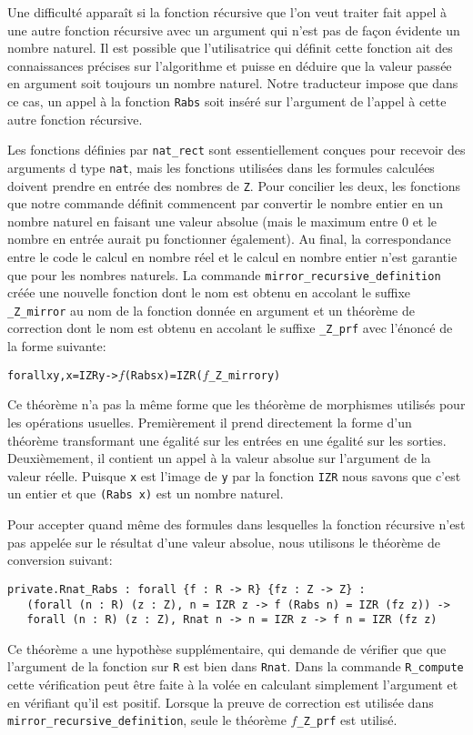\documentclass[draft]{jflart}
\begin{document}
Une difficulté apparaît si la fonction récursive que l'on veut traiter
fait appel à une autre fonction récursive avec un argument qui n'est
pas de façon évidente un nombre naturel.  Il est possible que
l'utilisatrice qui définit cette fonction ait des connaissances
précises sur l'algorithme et puisse en déduire que la valeur passée
en argument soit toujours un nombre naturel.  Notre traducteur impose
que dans ce cas, un appel à la fonction \texttt{Rabs} soit inséré sur
l'argument de l'appel à cette autre fonction récursive.

Les fonctions définies par \texttt{nat\_rect} sont essentiellement
conçues pour recevoir des arguments d type \texttt{nat}, mais les
fonctions utilisées dans les formules calculées doivent prendre en
entrée des nombres de \texttt{Z}.  Pour concilier les deux, les fonctions
que notre commande définit commencent par convertir le nombre entier en
un nombre naturel en faisant une valeur absolue (mais le maximum
entre 0 et le nombre en entrée aurait pu fonctionner également).  Au
final, la correspondance entre le code le calcul en nombre réel et le
calcul en nombre entier n'est garantie que pour les nombres naturels.
La commande \texttt{mirror\_recursive\_definition} créée une nouvelle
fonction dont le nom est obtenu en accolant le suffixe
\texttt{\_Z\_mirror} au nom de la fonction donnée en argument et un théorème
de correction dont le nom est obtenu en accolant le suffixe
\texttt{\_Z\_prf} avec l'énoncé de la forme suivante:
\begin{alltt}
forall x y, x = IZR y -> \(f\) (Rabs x) = IZR (\(f\)_Z_mirror y)
\end{alltt}

Ce théorème n'a pas la même forme que les théorème de morphismes
utilisés pour les opérations usuelles.  Premièrement il prend
directement la forme d'un théorème transformant une égalité sur les
entrées en une égalité sur les sorties.  Deuxièmement, il contient
un appel à la valeur absolue sur l'argument de la valeur réelle.
Puisque \texttt{x} est l'image de \texttt{y} par la fonction \texttt{IZR} nous
savons que c'est un entier et que \texttt{(Rabs x)} est un nombre
naturel.

Pour accepter quand même des formules dans lesquelles la fonction
récursive n'est pas appelée sur le résultat d'une valeur absolue, nous
utilisons le théorème de conversion suivant:
\begin{verbatim}
private.Rnat_Rabs : forall {f : R -> R} {fz : Z -> Z} :
   (forall (n : R) (z : Z), n = IZR z -> f (Rabs n) = IZR (fz z)) ->
   forall (n : R) (z : Z), Rnat n -> n = IZR z -> f n = IZR (fz z)
\end{verbatim}
Ce théorème a une hypothèse supplémentaire, qui demande de vérifier
que que l'argument de la fonction sur \texttt{R} est bien dans
\texttt{Rnat}.  Dans la commande \texttt{R\_compute} cette vérification peut
être faite à la volée en calculant simplement l'argument et en vérifiant
qu'il est positif.  Lorsque la preuve de correction est utilisée dans
\texttt{mirror\_recursive\_definition}, seule le théorème
{\(f\)\texttt{\_Z\_prf}} est utilisé.
\end{document}
